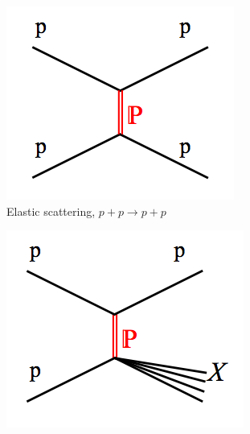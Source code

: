 \begin{figure}[h]
	\centering
	\begin{subfigure}[h]{0.32\textwidth}
		\includegraphics[width=\textwidth]{./Chapters/theory/minimum_bias/images/elastic_scattering.png}
		\caption{Elastic scattering, $p + p \rightarrow p + p$}
		\label{fig: proton-proton interactions - elastic scattering}
	\end{subfigure}
	\begin{subfigure}[h]{0.32\textwidth}
		\includegraphics[width=\textwidth]{./Chapters/theory/minimum_bias/images/single_diffractive.png}

\end{subfigure}
\end{figure}
